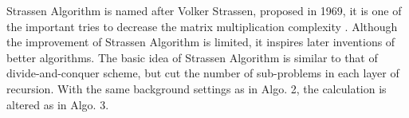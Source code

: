 \documentclass[catalog.tex]{subfiles}
\begin{document}
\begin{Algorithm}[Name\label{alg:\currfilebase_b}]
	\BlankLine


\end{Algorithm}

Strassen Algorithm is named after Volker Strassen, proposed in 1969, it is one of the important tries to decrease the matrix multiplication complexity \cite{strassen1969gaussian}. Although the improvement of Strassen Algorithm is limited, it inspires later inventions of better algorithms. The basic idea of Strassen Algorithm is similar to that of divide-and-conquer scheme, but cut the number of sub-problems in each layer of recursion. With the same background settings as in Algo. 2, the calculation is altered as in Algo. 3.
\end{document}
